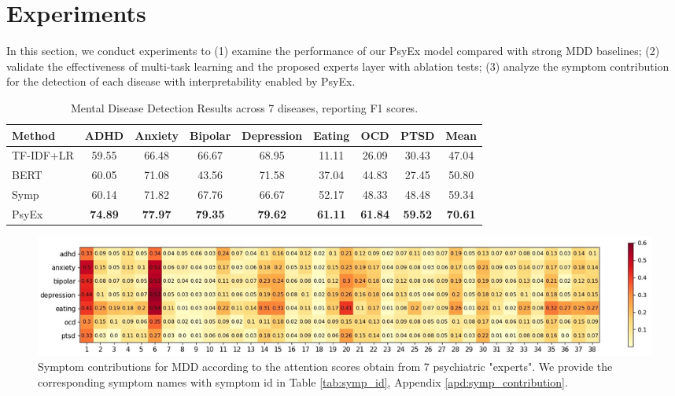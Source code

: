 \section{Experiments}
\label{sec:exp}

In this section, we conduct experiments to
(1) examine the performance of our PsyEx model compared with strong MDD baselines; (2) validate the effectiveness of multi-task learning and the proposed experts layer with ablation tests; (3) analyze the symptom contribution for the detection of each disease with interpretability enabled by PsyEx.

\begin{table}[h]
    \small
    \centering
    \begin{tabular}{l|ccccccc|c}
    \hline
    Method & ADHD & Anxiety & Bipolar & Depression & Eating & OCD & PTSD & Mean \\ 
    \hline
    TF-IDF+LR & 59.55&	66.48&	66.67&	68.95&	11.11&	26.09&	30.43&	47.04\\
    BERT \citep{nguyen2022improving} & 60.05&	71.08&	43.56&	71.58&	37.04&	44.83&	27.45&	50.80\\
    Symp \citep{Zhang2022SymptomIF} & 60.14&	71.82&	67.76&	66.67&	52.17&	48.33&	48.48&	59.34 \\
    \hline
    PsyEx & \textbf{74.89}&    \textbf{77.97}&	\textbf{79.35}&	\textbf{79.62}&	\textbf{61.11} &	\textbf{61.84}&	\textbf{59.52}&	\textbf{70.61} \\ 
    \hline
    \end{tabular}
    \caption{Mental Disease Detection Results across 7 diseases, reporting F1 scores.  }
    \label{tab:disease}
\end{table}

\begin{figure}[th]
    \centering
    \includegraphics[width=\linewidth]{figures/symp_contribution_top1_full_symp_wo_dsm.jpg}
    \caption{Symptom contributions for MDD according to the attention scores obtain from 7 psychiatric "experts". 
    We provide the corresponding symptom names with symptom id in Table \ref{tab:symp_id}, Appendix \ref{apd:symp_contribution}.}
    \label{fig:symp_contribution}
\end{figure}

